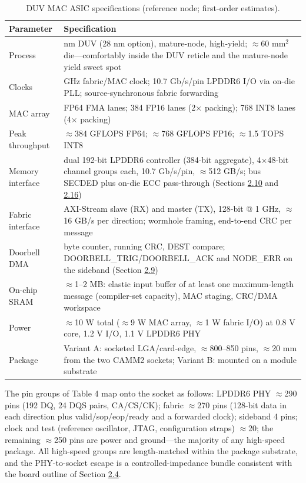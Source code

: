 \documentclass[10pt,twocolumn]{article}
\begin{document}
\begin{table}[t]
\centering
\footnotesize
\caption{DUV MAC ASIC specifications (reference node; first-order estimates).}\label{tab:4}
\begin{tabularx}{\columnwidth}{>{\hsize=0.4000\hsize}X>{\hsize=1.6000\hsize}X}
\toprule
Parameter & Specification \\
\midrule
Process & 14 nm DUV (28 nm option), mature-node, high-yield; $\approx$60 mm$^2$ die---comfortably inside the DUV reticle and the mature-node yield sweet spot \\
Clocks & 1 GHz fabric/MAC clock; 10.7 Gb/s/pin LPDDR6 I/O via on-die PLL; source-synchronous fabric forwarding \\
MAC array & 192 FP64 FMA lanes; 384 FP16 lanes (2$\times$ packing); 768 INT8 lanes (4$\times$ packing) \\
Peak throughput & $\approx$384 GFLOPS FP64; $\approx$768 GFLOPS FP16; $\approx$1.5 TOPS INT8 \\
Memory interface & dual 192-bit LPDDR6 controller (384-bit aggregate), 4$\times$48-bit channel groups each, 10.7 Gb/s/pin, $\approx$512 GB/s; bus SECDED plus on-die ECC pass-through (Sections \hyperref[sec:2.10]{2.10} and \hyperref[sec:2.16]{2.16}) \\
Fabric interface & AXI-Stream slave (RX) and master (TX), 128-bit @ 1 GHz, $\approx$16 GB/s per direction; wormhole framing, end-to-end CRC per message \\
Doorbell DMA & byte counter, running CRC, DEST compare; DOORBELL\_TRIG/DOORBELL\_ACK and NODE\_ERR on the sideband (Section \hyperref[sec:2.9]{2.9}) \\
On-chip SRAM & $\approx$1--2 MB: elastic input buffer of at least one maximum-length message (compiler-set capacity), MAC staging, CRC/DMA workspace \\
Power & $\approx$10 W total ($\approx$9 W MAC array, $\approx$1 W fabric I/O) at 0.8 V core, 1.2 V I/O, 1.1 V LPDDR6 PHY \\
Package & Variant A: socketed LGA/card-edge, $\approx$800--850 pins, $\approx$20 mm from the two CAMM2 sockets; Variant B: mounted on a module substrate \\
\bottomrule
\end{tabularx}
\end{table}


The pin groups of Table 4 map onto the socket as follows: LPDDR6 PHY $\approx$290 pins (192 DQ, 24 DQS pairs, CA/CS/CK); fabric $\approx$270 pins (128-bit data in each direction plus valid/sop/eop/ready and a forwarded clock); sideband 4 pins; clock and test (reference oscillator, JTAG, configuration straps) $\approx$20; the remaining $\approx$250 pins are power and ground---the majority of any high-speed package. All high-speed groups are length-matched within the package substrate, and the PHY-to-socket escape is a controlled-impedance bundle consistent with the board outline of Section \hyperref[sec:2.4]{2.4}.
\end{document}
